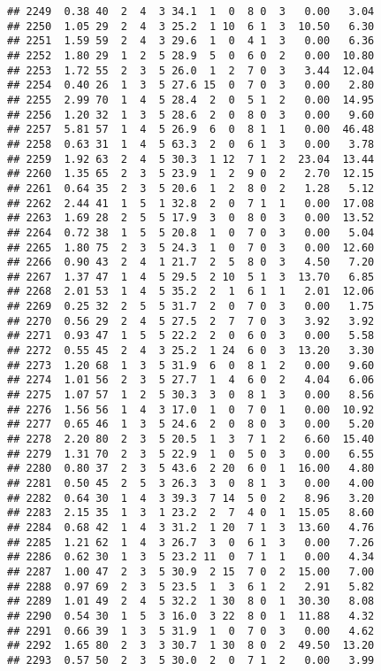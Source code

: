 \documentclass[
]{article}
\begin{document}
\begin{verbatim}
## 2249  0.38 40  2  4  3 34.1  1  0  8 0  3   0.00   3.04
## 2250  1.05 29  2  4  3 25.2  1 10  6 1  3  10.50   6.30
## 2251  1.59 59  2  4  3 29.6  1  0  4 1  3   0.00   6.36
## 2252  1.80 29  1  2  5 28.9  5  0  6 0  2   0.00  10.80
## 2253  1.72 55  2  3  5 26.0  1  2  7 0  3   3.44  12.04
## 2254  0.40 26  1  3  5 27.6 15  0  7 0  3   0.00   2.80
## 2255  2.99 70  1  4  5 28.4  2  0  5 1  2   0.00  14.95
## 2256  1.20 32  1  3  5 28.6  2  0  8 0  3   0.00   9.60
## 2257  5.81 57  1  4  5 26.9  6  0  8 1  1   0.00  46.48
## 2258  0.63 31  1  4  5 63.3  2  0  6 1  3   0.00   3.78
## 2259  1.92 63  2  4  5 30.3  1 12  7 1  2  23.04  13.44
## 2260  1.35 65  2  3  5 23.9  1  2  9 0  2   2.70  12.15
## 2261  0.64 35  2  3  5 20.6  1  2  8 0  2   1.28   5.12
## 2262  2.44 41  1  5  1 32.8  2  0  7 1  1   0.00  17.08
## 2263  1.69 28  2  5  5 17.9  3  0  8 0  3   0.00  13.52
## 2264  0.72 38  1  5  5 20.8  1  0  7 0  3   0.00   5.04
## 2265  1.80 75  2  3  5 24.3  1  0  7 0  3   0.00  12.60
## 2266  0.90 43  2  4  1 21.7  2  5  8 0  3   4.50   7.20
## 2267  1.37 47  1  4  5 29.5  2 10  5 1  3  13.70   6.85
## 2268  2.01 53  1  4  5 35.2  2  1  6 1  1   2.01  12.06
## 2269  0.25 32  2  5  5 31.7  2  0  7 0  3   0.00   1.75
## 2270  0.56 29  2  4  5 27.5  2  7  7 0  3   3.92   3.92
## 2271  0.93 47  1  5  5 22.2  2  0  6 0  3   0.00   5.58
## 2272  0.55 45  2  4  3 25.2  1 24  6 0  3  13.20   3.30
## 2273  1.20 68  1  3  5 31.9  6  0  8 1  2   0.00   9.60
## 2274  1.01 56  2  3  5 27.7  1  4  6 0  2   4.04   6.06
## 2275  1.07 57  1  2  5 30.3  3  0  8 1  3   0.00   8.56
## 2276  1.56 56  1  4  3 17.0  1  0  7 0  1   0.00  10.92
## 2277  0.65 46  1  3  5 24.6  2  0  8 0  3   0.00   5.20
## 2278  2.20 80  2  3  5 20.5  1  3  7 1  2   6.60  15.40
## 2279  1.31 70  2  3  5 22.9  1  0  5 0  3   0.00   6.55
## 2280  0.80 37  2  3  5 43.6  2 20  6 0  1  16.00   4.80
## 2281  0.50 45  2  5  3 26.3  3  0  8 1  3   0.00   4.00
## 2282  0.64 30  1  4  3 39.3  7 14  5 0  2   8.96   3.20
## 2283  2.15 35  1  3  1 23.2  2  7  4 0  1  15.05   8.60
## 2284  0.68 42  1  4  3 31.2  1 20  7 1  3  13.60   4.76
## 2285  1.21 62  1  4  3 26.7  3  0  6 1  3   0.00   7.26
## 2286  0.62 30  1  3  5 23.2 11  0  7 1  1   0.00   4.34
## 2287  1.00 47  2  3  5 30.9  2 15  7 0  2  15.00   7.00
## 2288  0.97 69  2  3  5 23.5  1  3  6 1  2   2.91   5.82
## 2289  1.01 49  2  4  5 32.2  1 30  8 0  1  30.30   8.08
## 2290  0.54 30  1  5  3 16.0  3 22  8 0  1  11.88   4.32
## 2291  0.66 39  1  3  5 31.9  1  0  7 0  3   0.00   4.62
## 2292  1.65 80  2  3  3 30.7  1 30  8 0  2  49.50  13.20
## 2293  0.57 50  2  3  5 30.0  2  0  7 1  2   0.00   3.99

\end{verbatim}
\end{document}
